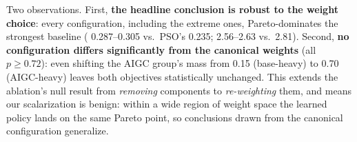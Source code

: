 Two observations. First, \textbf{the headline conclusion is
robust to the weight choice}: every configuration, including
the extreme ones, Pareto-dominates the strongest baseline
(\slo{} 0.287--0.305 vs.\ PSO's 0.235; \etok{} 2.56--2.63
vs.\ 2.81). Second, \textbf{no configuration differs
significantly from the canonical weights} (all $p \ge 0.72$):
even shifting the AIGC group's mass from 0.15 (base-heavy) to
0.70 (AIGC-heavy) leaves both objectives statistically
unchanged. This extends the ablation's null result from
\emph{removing} components to \emph{re-weighting} them, and
means our scalarization is benign: within a wide region of
weight space the learned policy lands on the same Pareto
point, so conclusions drawn from the canonical configuration
generalize.
